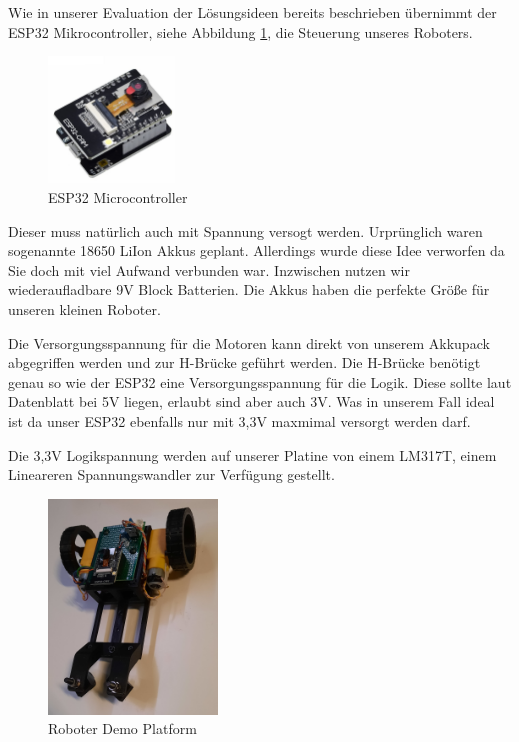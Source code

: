 \begin{flushleft}
    Wie in unserer Evaluation der Lösungsideen bereits beschrieben übernimmt der ESP32 Mikrocontroller, siehe Abbildung \ref{fig:esp32_mc}, die Steuerung unseres Roboters. 
    
    \begin{figure}[h!]
        \centering
        \includegraphics[width=0.3\textwidth]{imgs/Roboter/Real/esp32.jpg}
        \caption{ESP32 Microcontroller}
        \label{fig:esp32_mc}%
    \end{figure}

    Dieser muss natürlich auch mit Spannung versogt werden.
    Urprünglich waren sogenannte 18650 LiIon Akkus geplant. Allerdings wurde diese Idee verworfen da Sie doch mit viel Aufwand verbunden war.
    Inzwischen nutzen wir wiederaufladbare 9V Block Batterien. Die Akkus haben die perfekte Größe für unseren kleinen Roboter.

    Die Versorgungsspannung für die Motoren kann direkt von unserem Akkupack abgegriffen werden und zur H-Brücke geführt werden.
    Die H-Brücke benötigt genau so wie der ESP32 eine Versorgungsspannung für die Logik.
    Diese sollte laut Datenblatt bei 5V liegen, erlaubt sind aber auch 3V. Was in unserem Fall ideal ist da unser ESP32
    ebenfalls nur mit 3,3V maxmimal versorgt werden darf.

    Die 3,3V Logikspannung werden auf unserer Platine von einem LM317T, einem Lineareren Spannungswandler zur Verfügung gestellt.

    \begin{figure}[h!]
        \centering
        \includegraphics[width=0.4\textwidth, angle=180,origin=c]{imgs/Roboter/Real/Roboter.jpg}
        \caption{Roboter Demo Platform}
    \end{figure}


\end{flushleft}
